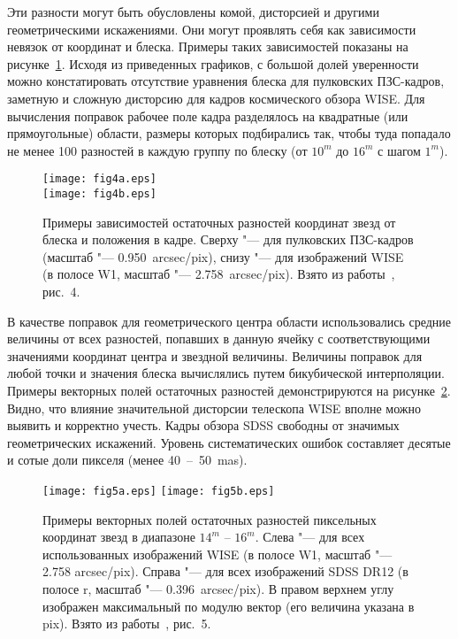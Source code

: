 Эти разности могут быть обусловлены комой, дисторсией и другими геометрическими искажениями. Они могут проявлять себя как зависимости невязок от координат и блеска. Примеры таких зависимостей показаны на рисунке~\ref{fig:15posL}. Исходя из приведенных графиков, с большой долей уверенности можно констатировать отсутствие уравнения блеска для пулковских ПЗС-кадров, заметную и сложную дисторсию для кадров космического обзора WISE. Для вычисления поправок рабочее поле кадра разделялось на квадратные (или прямоугольные) области, размеры которых подбирались так, чтобы туда попадало не менее 100 разностей в каждую группу по блеску (от $10^m$ до $16^m$ с шагом $1^m$).

\begin{figure}[h]
\centering
\texttt{[image: fig4a.eps]}\\
\texttt{[image: fig4b.eps]}
\caption{Примеры зависимостей остаточных разностей координат звезд от блеска и положения в кадре. Сверху "--- для пулковских ПЗС-кадров (масштаб "--- 0.950~arcsec/pix), снизу "--- для изображений WISE (в полосе W1, масштаб "--- 2.758~arcsec/pix). Взято из работы~\cite{2015AstL...41..833K}, рис.~4.}
\label{fig:15posL}
\end{figure}

В качестве поправок для геометрического центра области использовались средние величины от всех разностей, попавших в данную ячейку с соответствующими значениями координат центра и звездной величины. Величины поправок для любой точки и значения блеска вычислялись путем бикубической интерполяции. Примеры векторных полей остаточных разностей демонстрируются на рисунке~\ref{fig:15pixL}. Видно, что влияние значительной дисторсии телескопа WISE вполне можно выявить и корректно учесть. Кадры обзора SDSS свободны от значимых геометрических искажений. Уровень систематических ошибок составляет десятые и сотые доли пикселя (менее 40~--~50~mas).

\begin{figure}[h]
\centering
\texttt{[image: fig5a.eps]}
\texttt{[image: fig5b.eps]}
\caption{Примеры векторных полей остаточных разностей пиксельных координат звезд в диапазоне $14^m$ -- $16^m$. Слева "--- для всех использованных изображений WISE (в полосе W1, масштаб "--- 2.758 arcsec/pix). Справа "--- для всех изображений SDSS DR12 (в полосе r, масштаб "--- 0.396~arcsec/pix). В правом верхнем углу изображен максимальный по модулю вектор (его величина указана в pix). Взято из работы~\cite{2015AstL...41..833K}, рис.~5.}
\label{fig:15pixL}
\end{figure}

